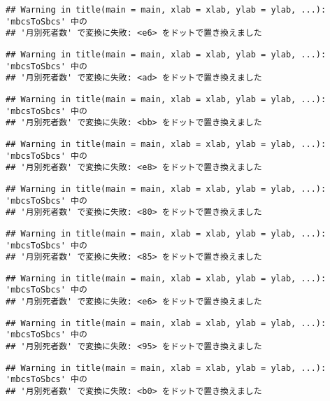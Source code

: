 \documentclass[]{article}
\begin{document}
\begin{verbatim}
## Warning in title(main = main, xlab = xlab, ylab = ylab, ...): 'mbcsToSbcs' 中の
## '月別死者数' で変換に失敗: <e6> をドットで置き換えました
\end{verbatim}

\begin{verbatim}
## Warning in title(main = main, xlab = xlab, ylab = ylab, ...): 'mbcsToSbcs' 中の
## '月別死者数' で変換に失敗: <ad> をドットで置き換えました
\end{verbatim}

\begin{verbatim}
## Warning in title(main = main, xlab = xlab, ylab = ylab, ...): 'mbcsToSbcs' 中の
## '月別死者数' で変換に失敗: <bb> をドットで置き換えました
\end{verbatim}

\begin{verbatim}
## Warning in title(main = main, xlab = xlab, ylab = ylab, ...): 'mbcsToSbcs' 中の
## '月別死者数' で変換に失敗: <e8> をドットで置き換えました
\end{verbatim}

\begin{verbatim}
## Warning in title(main = main, xlab = xlab, ylab = ylab, ...): 'mbcsToSbcs' 中の
## '月別死者数' で変換に失敗: <80> をドットで置き換えました
\end{verbatim}

\begin{verbatim}
## Warning in title(main = main, xlab = xlab, ylab = ylab, ...): 'mbcsToSbcs' 中の
## '月別死者数' で変換に失敗: <85> をドットで置き換えました
\end{verbatim}

\begin{verbatim}
## Warning in title(main = main, xlab = xlab, ylab = ylab, ...): 'mbcsToSbcs' 中の
## '月別死者数' で変換に失敗: <e6> をドットで置き換えました
\end{verbatim}

\begin{verbatim}
## Warning in title(main = main, xlab = xlab, ylab = ylab, ...): 'mbcsToSbcs' 中の
## '月別死者数' で変換に失敗: <95> をドットで置き換えました
\end{verbatim}

\begin{verbatim}
## Warning in title(main = main, xlab = xlab, ylab = ylab, ...): 'mbcsToSbcs' 中の
## '月別死者数' で変換に失敗: <b0> をドットで置き換えました
\end{verbatim}
\end{document}
